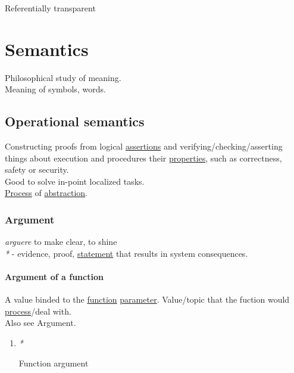 \documentclass[a4paper,14pt,oneside]{book}
\begin{document}
\label{orgb537729}Referentially transparent\\

\chapter{\label{org457e52f}Semantics}
\label{sec:orgd91ec78}
Philosophical study of meaning.\\
Meaning of symbols, words.\\

\section{\label{org43ce6f6}Operational semantics}
\label{sec:org9952d8d}
Constructing proofs from logical \hyperref[org3d22dd9]{assertions} and verifying/checking/asserting things about execution and procedures their \hyperref[org25713c8]{properties}, such as correctness, safety or security.\\

Good to solve in-point localized tasks.\\

\hyperref[orgc8d4f36]{Process} of \hyperref[orgf49d7a2]{abstraction}.\\

\subsection{\label{org34483c4}Argument}
\label{sec:org370cf8e}
\emph{arguere} to make clear, to shine\\

\emph{*} - evidence, proof, \hyperref[orga37fc79]{statement} that results in system consequences.\\

\subsubsection{\label{org92bf6e6}Argument of a function}
\label{sec:org4fa0e32}
A value binded to the \hyperref[orgee59a2b]{function} \hyperref[orga55841e]{parameter}. Value/topic that the fuction would \hyperref[orgc8d4f36]{process}/deal with.\\

Also see \label{orgad7c950}Argument.\\

\begin{enumerate}
\item \emph{*}
\label{sec:org3a58170}

\label{org797f1fc}Function argument\\
\end{enumerate}
\end{document}
